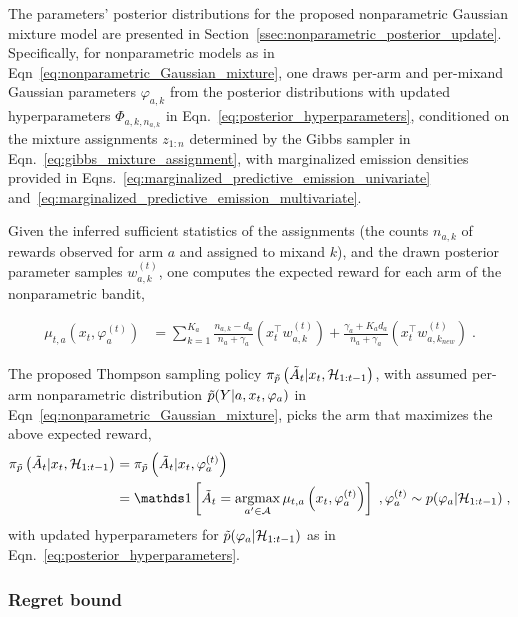 The parameters' posterior distributions for the proposed nonparametric Gaussian mixture model are presented in Section~\ref{ssec:nonparametric_posterior_update}.
Specifically, for nonparametric models as in Eqn~\eqref{eq:nonparametric_Gaussian_mixture}, one draws per-arm and per-mixand Gaussian parameters $\varphi_{a,k}$ from the posterior distributions with updated hyperparameters $\varPhi_{a,k,n_{a,k}}$ in Eqn.~\eqref{eq:posterior_hyperparameters}, conditioned on the mixture assignments $z_{1:n}$ determined by the Gibbs sampler in Eqn.~\eqref{eq:gibbs_mixture_assignment}, with marginalized emission densities provided in Eqns.~\eqref{eq:marginalized_predictive_emission_univariate} and~\eqref{eq:marginalized_predictive_emission_multivariate}.

Given the inferred sufficient statistics of the assignments (\ie the counts $n_{a,k}$ of rewards observed for arm $a$ and assigned to mixand $k$), and the drawn posterior parameter samples $w_{a,k}^{(t)}$, one computes the expected reward for each arm of the nonparametric bandit, \ie

\begin{align}
\mu_{t,a}(x_{t},\varphi_{a}^{(t)})&=\sum_{k=1}^{K_a} \frac{n_{a,k}-d_a}{n_a+\gamma_a} \left(x_{t}^\top w_{a,k}^{(t)}\right) + \frac{\gamma_a+K_ad_a}{n_a+\gamma_a} \left(x_{t}^\top w_{a,k_{new}}^{(t)} \right)\; .
\label{eq:nonparametric_expected_reward}
\end{align}

The proposed Thompson sampling policy $\pi_{\tilde{p}}\left( \tilde{A}_t|x_{t},\mathcal{H}_{1:t-1} \right)$, with assumed per-arm nonparametric distribution $\tilde{p}(Y|a,x_t,\varphi_a)$ in Eqn~\eqref{eq:nonparametric_Gaussian_mixture}, picks the arm that maximizes the above expected reward, \ie
\begin{align}
\myPitilde{\Atilde_t|x_{t},\HH_{1:t-1}}&=\myPitilde{\Atilde_t|x_{t},\varphi_{a}^{(t)}} \nonumber \\
& =\myind{\Atilde_t=\argmax_{a^\prime \in \A} \mu_{t,a}\left(x_{t},\varphi_{a}^{(t)}\right)}\;, \varphi_{a}^{(t)} \sim p(\varphi_{a}|\HH_{1:t-1}) \;,
\end{align}
with updated hyperparameters for $\tilde{p}(\varphi_{a}|\mathcal{H}_{1:t-1})$ as in Eqn.~\eqref{eq:posterior_hyperparameters}.

\subsubsection{Regret bound}
\label{sssec:nonparametric_thompson_sampling_regret_bound}

